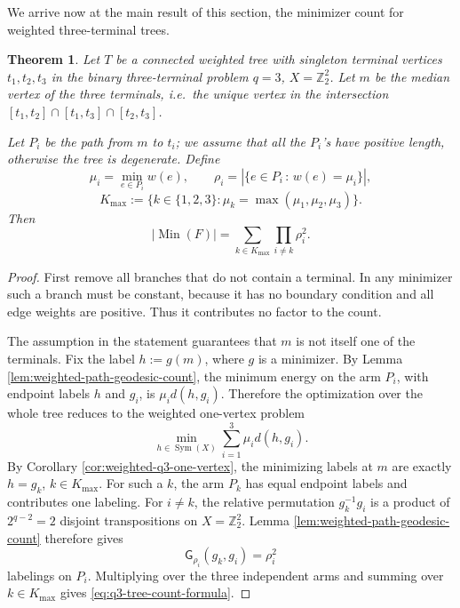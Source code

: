 \documentclass[11pt,oneside,letterpaper]{article}
\numberwithin{equation}{section}
\newtheorem{theorem}{Theorem}
\theoremstyle{definition}
\theoremstyle{remark}
\DeclareMathOperator{\Sym}{Sym}
\begin{document}
We arrive now at the main result of this section, the minimizer count for weighted three-terminal trees.

\begin{theorem}
  \label{thm:q3-tree-minimizer-count}
  Let $T$ be a connected weighted tree with singleton terminal vertices
  $t_1,t_2,t_3$ in the binary three-terminal problem
  $q=3$, $X=\mathbb{Z}_2^2$. Let $m$ be the \emph{median vertex} of the three terminals, i.e.~the unique
  vertex in the intersection $[t_1,t_2]\cap[t_1,t_3]\cap[t_2,t_3]$.

  Let $P_i$ be the path from $m$ to $t_i$; we assume that all the $P_i$'s have positive length, otherwise the tree is degenerate. Define
  \begin{equation}
    \mu_i=\min_{e\in P_i}w(e),\qquad
    \rho_i=|\{e\in P_i \, :\, w(e)=\mu_i\}|,
  \end{equation}
  \begin{equation}
    K_{\max}:=\{k\in\{1,2,3\}:\mu_k=\max(\mu_1,\mu_2,\mu_3)\}.
  \end{equation}
  Then
  \begin{equation}
    \label{eq:q3-tree-count-formula}
    |\operatorname{Min}(F)|
    =
    \sum_{k\in K_{\max}}\prod_{i\ne k}\rho_i^2.
  \end{equation}
\end{theorem}
\begin{proof}
  First remove all branches that do not contain a terminal.  In any
  minimizer such a branch must be constant, because it has no boundary
  condition and all edge weights are positive.  Thus it contributes no
  factor to the count.

  The assumption in the statement guarantees that $m$ is not itself one of the terminals. Fix the label $h:=g(m)$, where $g$ is a minimizer. By Lemma \ref{lem:weighted-path-geodesic-count}, the minimum energy on
  the arm $P_i$, with endpoint labels $h$ and $g_i$, is $\mu_i d(h,g_i)$. Therefore the optimization over the whole tree reduces to the weighted
  one-vertex problem
  \begin{equation}
    \min_{h\in \Sym(X)}\sum_{i=1}^3\mu_i d(h,g_i).
  \end{equation}
  By Corollary \ref{cor:weighted-q3-one-vertex}, the minimizing labels at
  $m$ are exactly $h=g_k$, $k\in K_{\max}$. For such a $k$, the arm $P_k$ has equal endpoint labels and contributes
  one labeling.  For $i\ne k$, the relative permutation $g_k^{-1}g_i$ is
  a product of $2^{q-2}=2$ disjoint transpositions on $X=\mathbb{Z}_2^2$.  Lemma
  \ref{lem:weighted-path-geodesic-count} therefore gives
  \begin{equation}
    \mathsf G_{\rho_i}(g_k,g_i)=\rho_i^2
  \end{equation}
  labelings on $P_i$.  Multiplying over the three independent arms and
  summing over $k\in K_{\max}$ gives
  \eqref{eq:q3-tree-count-formula}.
\end{proof}
\end{document}
